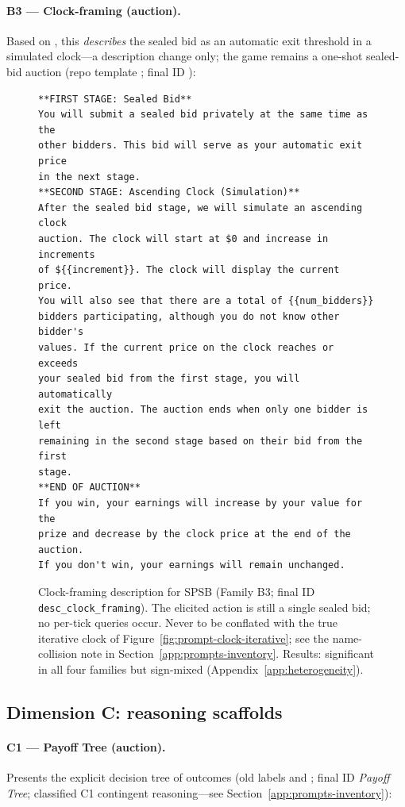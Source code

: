 \paragraph{B3 --- Clock-framing (auction).} Based on \citet{breitmoser2022obviousness}, this \emph{describes} the sealed bid as an automatic exit threshold in a simulated clock---a description change only; the game remains a one-shot sealed-bid auction (repo template ; final ID ):

\begin{figure}[H]
\begin{lstlisting}
**FIRST STAGE: Sealed Bid**
You will submit a sealed bid privately at the same time as the
other bidders. This bid will serve as your automatic exit price
in the next stage.
**SECOND STAGE: Ascending Clock (Simulation)**
After the sealed bid stage, we will simulate an ascending clock
auction. The clock will start at $0 and increase in increments
of ${{increment}}. The clock will display the current price.
You will also see that there are a total of {{num_bidders}}
bidders participating, although you do not know other bidder's
values. If the current price on the clock reaches or exceeds
your sealed bid from the first stage, you will automatically
exit the auction. The auction ends when only one bidder is left
remaining in the second stage based on their bid from the first
stage.
**END OF AUCTION**
If you win, your earnings will increase by your value for the
prize and decrease by the clock price at the end of the auction.
If you don't win, your earnings will remain unchanged.
\end{lstlisting}
\caption{Clock-framing description for SPSB (Family B3; final ID \texttt{desc\_clock\_framing}). The elicited action is still a single sealed bid; no per-tick queries occur. Never to be conflated with the true iterative clock of Figure~\ref{fig:prompt-clock-iterative}; see the name-collision note in Section~\ref{app:prompts-inventory}. Results: significant in all four families but sign-mixed (Appendix~\ref{app:heterogeneity}).}
\label{fig:prompt-clock-framing}
\end{figure}

\subsection{Dimension C: reasoning scaffolds}\label{app:prompts-scaffold}

\paragraph{C1 --- Payoff Tree (auction).} Presents the explicit decision tree of outcomes (old labels  and ; final ID \emph{Payoff Tree}; classified C1 contingent reasoning---see Section~\ref{app:prompts-inventory}):

